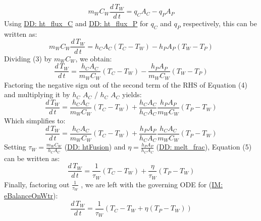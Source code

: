 \documentclass[12pt]{article}
\begin{document}
\begin{displaymath}
{m_{W}} {C_{W}} \frac{d\,{T_{W}}}{d\,t}={q_{C}} {A_{C}}-{q_{P}} {A_{P}}
\end{displaymath}
Using \hyperref[DD:ht.flux.C]{DD: ht\_flux\_C} and \hyperref[DD:ht.flux.P]{DD: ht\_flux\_P} for ${q_{C}}$ and ${q_{P}}$ respectively, this can be written as:
\begin{displaymath}
{m_{W}} {C_{W}} \frac{d\,{T_{W}}}{d\,t}={h_{C}} {A_{C}} \left({T_{C}}-{T_{W}}\right)-{h_{P}} {A_{P}} \left({T_{W}}-{T_{P}}\right)
\end{displaymath}
Dividing (3) by ${m_{W}}$${C_{W}}$, we obtain:
\begin{displaymath}
\frac{d\,{T_{W}}}{d\,t}=\frac{{h_{C}} {A_{C}}}{{m_{W}} {C_{W}}} \left({T_{C}}-{T_{W}}\right)-\frac{{h_{P}} {A_{P}}}{{m_{W}} {C_{W}}} \left({T_{W}}-{T_{P}}\right)
\end{displaymath}
Factoring the negative sign out of the second term of the RHS of Equation (4) and multiplying it by ${h_{C}}$ ${A_{C}}$ / ${h_{C}}$ ${A_{C}}$ yields:
\begin{displaymath}
\frac{d\,{T_{W}}}{d\,t}=\frac{{h_{C}} {A_{C}}}{{m_{W}} {C_{W}}} \left({T_{C}}-{T_{W}}\right)+\frac{{h_{C}} {A_{C}}}{{h_{C}} {A_{C}}} \frac{{h_{P}} {A_{P}}}{{m_{W}} {C_{W}}} \left({T_{P}}-{T_{W}}\right)
\end{displaymath}
Which simplifies to:
\begin{displaymath}
\frac{d\,{T_{W}}}{d\,t}=\frac{{h_{C}} {A_{C}}}{{m_{W}} {C_{W}}} \left({T_{C}}-{T_{W}}\right)+\frac{{h_{P}} {A_{P}}}{{h_{C}} {A_{C}}} \frac{{h_{C}} {A_{C}}}{{m_{W}} {C_{W}}} \left({T_{P}}-{T_{W}}\right)
\end{displaymath}
Setting ${τ_{W}}=\frac{{m_{W}} {C_{W}}}{{h_{C}} {A_{C}}}$ (\hyperref[DD:htFusion]{DD: htFusion}) and $η=\frac{{h_{P}} {A_{P}}}{{h_{C}} {A_{C}}}$ (\hyperref[DD:melt.frac]{DD: melt\_frac}), Equation (5) can be written as:
\begin{displaymath}
\frac{d\,{T_{W}}}{d\,t}=\frac{1}{{τ_{W}}} \left({T_{C}}-{T_{W}}\right)+\frac{η}{{τ_{W}}} \left({T_{P}}-{T_{W}}\right)
\end{displaymath}
Finally, factoring out $\frac{1}{{τ_{W}}}$ , we are left with the governing ODE for (\hyperref[IM:eBalanceOnWtr]{IM: eBalanceOnWtr}):
\begin{displaymath}
\frac{d\,{T_{W}}}{d\,t}=\frac{1}{{τ_{W}}} \left({T_{C}}-{T_{W}}+η \left({T_{P}}-{T_{W}}\right)\right)
\end{displaymath}
\par~
\end{document}
